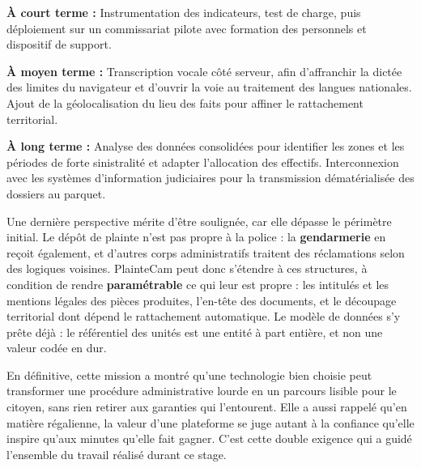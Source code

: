\textbf{À court terme :} Instrumentation des indicateurs, test de charge, puis déploiement sur un commissariat pilote avec formation des personnels et dispositif de support.

\textbf{À moyen terme :} Transcription vocale côté serveur, afin d'affranchir la dictée des limites du navigateur et d'ouvrir la voie au traitement des langues nationales. Ajout de la géolocalisation du lieu des faits pour affiner le rattachement territorial.

\textbf{À long terme :} Analyse des données consolidées pour identifier les zones et les périodes de forte sinistralité et adapter l'allocation des effectifs. Interconnexion avec les systèmes d'information judiciaires pour la transmission dématérialisée des dossiers au parquet.

\medskip

Une dernière perspective mérite d'être soulignée, car elle dépasse le périmètre initial. Le dépôt de plainte n'est pas propre à la police : la \textbf{gendarmerie} en reçoit également, et d'autres corps administratifs traitent des réclamations selon des logiques voisines. PlainteCam peut donc s'étendre à ces structures, à condition de rendre \textbf{paramétrable} ce qui leur est propre : les intitulés et les mentions légales des pièces produites, l'en-tête des documents, et le découpage territorial dont dépend le rattachement automatique. Le modèle de données s'y prête déjà : le référentiel des unités est une entité à part entière, et non une valeur codée en dur.

\medskip

En définitive, cette mission a montré qu'une technologie bien choisie peut transformer une procédure administrative lourde en un parcours lisible pour le citoyen, sans rien retirer aux garanties qui l'entourent. Elle a aussi rappelé qu'en matière régalienne, la valeur d'une plateforme se juge autant à la confiance qu'elle inspire qu'aux minutes qu'elle fait gagner. C'est cette double exigence qui a guidé l'ensemble du travail réalisé durant ce stage.

